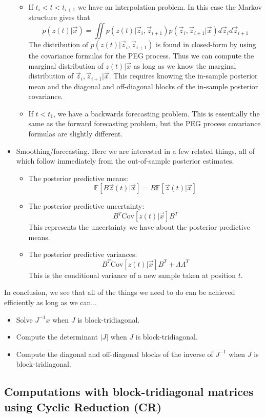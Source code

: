 \documentclass{article}
\theoremstyle{definition}
\begin{document}
\begin{itemize}
\begin{itemize}
\item If $t_{i}<t<t_{i+1}$ we have an interpolation problem. In this case
the Markov structure gives that 
\[
p(z(t)|\vec x) = \iint p(z(t)|\vec z_i,\vec z_{i+1}) p(\vec z_i,\vec z_{i+1} |\vec x) d\vec z_i d\vec z_{i+1}
\]
The distribution of $p(z(t)|\vec z_i,\vec z_{i+1})$ is found in closed-form by using the covariance formulas for the PEG process.  Thus we can compute the marginal distribution of $z(t)|\vec x$ as long as we know the marginal distribution of $\vec z_i,\vec z_{i+1}|\vec x$.   This requires knowing the in-sample posterior mean and the diagonal and off-diagonal blocks of the in-sample posterior covariance.
\item If $t<t_{1}$, we have a backwards forecasting problem. This is essentially
the same as the forward forecasting problem, but the PEG process covariance
formulas are slightly different.
\end{itemize}
\item Smoothing/forecasting. Here we are interested in a few related
things, all of which follow immediately from the out-of-sample posterior
estimates.
\begin{itemize}
\item The posterior predictive means: 
\[
\mathbb{E}\left[B\vec{z}(t)|\vec{x}\right]=B\mathbb{E}\left[\vec{z}(t)|\vec{x}\right]
\]
\item The posterior predictive uncertainty:
\[
B^{T}\text{Cov}\left[z(t)|\vec{x}\right]B^{T}
\]
This represents the uncertainty we have about the posterior predictive
means.
\item The posterior predictive variances:
\[
B^{T}\text{Cov}\left[z(t)|\vec{x}\right]B^{T}+\Lambda\Lambda^{T}
\]
This is the conditional variance of a new sample taken at position
$t$.
\end{itemize}
\end{itemize}
In conclusion, we see that all of the things we need to do can be
achieved efficiently as long as we can...
\begin{itemize}
\item Solve $J^{-1}x$ when $J$ is block-tridiagonal.
\item Compute the determinant $\left|J\right|$ when $J$ is block-tridiagonal.
\item Compute the diagonal and off-diagonal blocks of the inverse of $J^{-1}$ when $J$ is block-tridiagonal. 
\end{itemize}

\subsection{Computations with block-tridiagonal matrices using Cyclic Reduction
(CR)}
\end{document}
